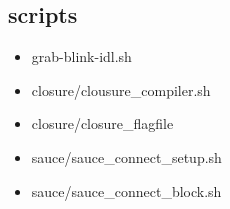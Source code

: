 \subsection{scripts}


\begin{itemize}
  \item grab-blink-idl.sh
  \item closure/clousure\_compiler.sh
  \item closure/closure\_flagfile
  \item sauce/sauce\_connect\_setup.sh
  \item sauce/sauce\_connect\_block.sh
\end{itemize}
